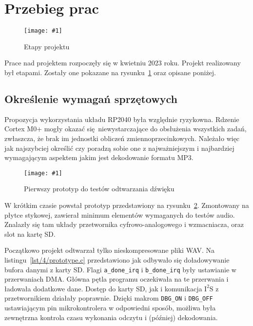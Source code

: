 \documentclass[12pt]{report}
\newcommand{\imgint}[4]{
	\begin{figure}[{#4}]
		\centering
		\texttt{[image: \#1]}
		\caption{#2}
		\label{#1}
	\end{figure}
}
\newcommand{\imgh}[3]{\imgint{#1}{#2}{#3}{H}}
\newcommand{\isqs}{$\text{I}^{2}\text{S}$}
\newcommand{\lstfile}[3]{
	\noindent
	\hspace{0.1\linewidth}
	\begin{minipage}{0.8\linewidth}
		
	\end{minipage}
	\vspace{0.3cm}
}
\begin{document}
	\section{Przebieg prac}
		\imgh{4/PicoRadio-steps}{Etapy projektu}{1}
	
		Prace nad projektem rozpoczęły się w kwietniu 2023 roku. Projekt realizowany był etapami. Zostały one pokazane na rysunku~\ref{4/PicoRadio-steps} oraz opisane poniżej.
		
		\subsection{Określenie wymagań sprzętowych}
			Propozycja wykorzystania układu RP2040 była względnie ryzykowna. Rdzenie Cortex M0+ mogły okazać się niewystarczające do obsłużenia wszystkich zadań, zwłaszcza, że brak im jednostki obliczeń zmiennoprzecinkowych. Należało więc jak najszybciej określić czy poradzą sobie one z najważniejszym i najbardziej wymagającym aspektem jakim jest dekodowanie formatu MP3.
			
			\imgh{4/prototype_1}{Pierwszy prototyp do testów odtwarzania dźwięku}{0.6}
			
			W krótkim czasie powstał prototyp przedstawiony na rysunku~\ref{4/prototype_1}. Zmontowany na płytce stykowej, zawierał minimum elementów wymaganych do testów audio. Znalazły się tam układy przetwornika cyfrowo-analogowego i wzmacniacza, oraz slot na kartę SD.
			
			\lstfile{c}{Realizacja podstawowego ładowania bufora}{lst/4/prototype.c}
			
			Początkowo projekt odtwarzał tylko nieskompresowane pliki WAV. Na listingu~\ref{lst/4/prototype.c} przedstawiono jak odbywało się doładowywanie bufora danymi z karty SD. Flagi \lstinline|a_done_irq| i \lstinline|b_done_irq| były ustawianie w przerwaniach DMA. Główna pętla programu oczekiwała na te przerwania i ładowała dodatkowe dane. Dostęp do karty SD, jak i komunikacja \isqs{} z przetwornikiem działały poprawnie. Dzięki makrom \lstinline|DBG_ON| i \lstinline|DBG_OFF| ustawiającym pin mikrokontrolera w odpowiedni sposób, możliwa była zewnętrzna kontrola czasu wykonania odczytu i (później) dekodowania.
			
			\lstfile{c}{Pomiar czasu dekodowania ramki MP3}{lst/4/benchmark.c}
			
\end{document}
